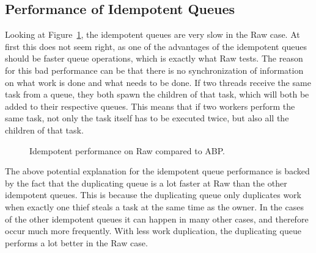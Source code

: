 \subsection{Performance of Idempotent Queues}
Looking at Figure~\ref{fig:idemraw}, the idempotent queues are very slow in the Raw case. At first this does not seem right, as one of the advantages of the idempotent queues should be faster queue operations, which is exactly what Raw tests. The reason for this bad performance can be that there is no synchronization of information on what work is done and what needs to be done. If two threads receive the same task from a queue, they both spawn the children of that task, which will both be added to their respective queues. This means that if two workers perform the same task, not only the task itself has to be executed twice, but also all the children of that task.

\begin{figure}
\caption{Idempotent performance on Raw compared to ABP.}
\label{fig:idemraw}
\end{figure}

The above potential explanation for the idempotent queue performance is backed by the fact that the duplicating queue is a lot faster at Raw than the other idempotent queues. This is because the duplicating queue only duplicates work when exactly one thief steals a task at the same time as the owner. In the cases of the other idempotent queues it can happen in many other cases, and therefore occur much more frequently. With less work duplication, the duplicating queue performs a lot better in the Raw case.